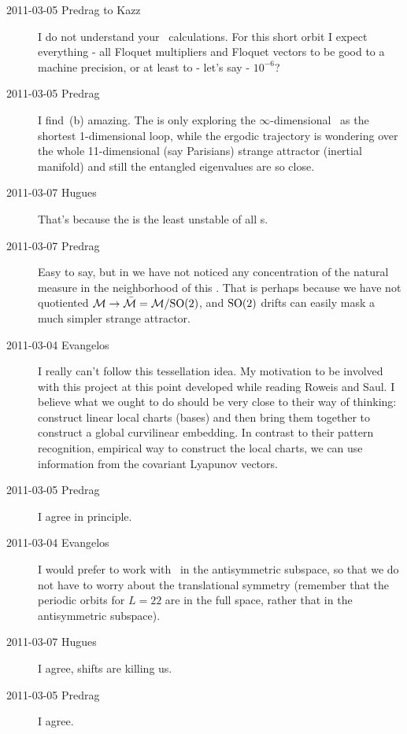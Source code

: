 \begin{description}
\item[2011-03-05 Predrag to Kazz] I do not understand your \po\ calculations.
For this short orbit I expect everything - all Floquet multipliers and
Floquet vectors to be good to a machine precision, or at least to - let's say -
$10^{-6}$?

\item[2011-03-05 Predrag]
I find
\,(b) amazing. The {\po}  is
only exploring the $\infty$-dimensional \statesp\ as the
shortest 1-dimensional loop, while the ergodic trajectory is
wondering over the whole 11-dimensional (say Parisians) strange attractor
(inertial manifold) and still the entangled eigenvalues are so close.

\item[2011-03-07 Hugues]
That's because the {\po}  is the least unstable of all
\po s.

\item[2011-03-07 Predrag] Easy to say, but in  we have
not noticed any concentration of the natural measure in the neighborhood of
this \po. That is perhaps because we have not quotiented
${\cal M} \to \bar{\cal M} = {\cal M}/\textrm{SO}(2)$, and $\textrm{SO}(2)$ drifts can easily
mask a much simpler strange attractor.


\item[2011-03-04 Evangelos]
I really can't follow this tessellation idea. My motivation to be
involved with this project at this point developed while reading Roweis
and Saul. I believe what we ought to do should be very close
to their way of thinking: construct linear local charts (bases) and then
bring them together to construct a global curvilinear embedding. In
contrast to their pattern recognition, empirical way to construct the
local charts, we can use information from the covariant Lyapunov vectors.

\item[2011-03-05 Predrag]
I agree in principle.

\item[2011-03-04 Evangelos]
I would prefer to work with \KS\ in the antisymmetric subspace, so that we do not
have to worry about the translational symmetry (remember that the periodic
orbits for $L=22$ are in the full space, rather that in the antisymmetric
subspace).

\item[2011-03-07 Hugues]
I agree, shifts are killing us.

\item[2011-03-05 Predrag]
I agree.



\end{description}
